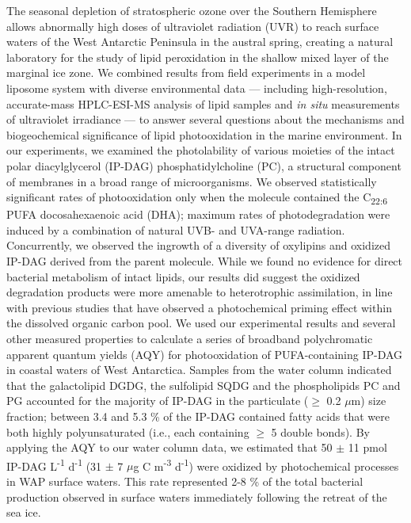 The seasonal depletion of stratospheric ozone over the Southern Hemisphere allows abnormally high doses of ultraviolet radiation (UVR) to reach surface waters of the West Antarctic Peninsula in the austral spring, creating a natural laboratory for the study of lipid peroxidation in the shallow mixed layer of the marginal ice zone. We combined results from field experiments in a model liposome system with diverse environmental data --- including high-resolution, accurate-mass HPLC-ESI-MS analysis of lipid samples and \emph{in situ} measurements of ultraviolet irradiance --- to answer several questions about the mechanisms and biogeochemical significance of lipid photooxidation in the marine environment. In our experiments, we examined the photolability of various moieties of the intact polar diacylglycerol (IP-DAG) phosphatidylcholine (PC), a structural component of membranes in a broad range of microorganisms. We observed statistically significant rates of photooxidation only when the molecule contained the C\textsubscript{22:6} PUFA docosahexaenoic acid (DHA); maximum rates of photodegradation were induced by a combination of natural UVB- and UVA-range radiation. Concurrently, we observed the ingrowth of a diversity of oxylipins and oxidized IP-DAG derived from the parent molecule. While we found no evidence for direct bacterial metabolism of intact lipids, our results did suggest the oxidized degradation products were more amenable to heterotrophic assimilation, in line with previous studies that have observed a photochemical priming effect within the dissolved organic carbon pool. We used our experimental results and several other measured properties to calculate a series of broadband polychromatic apparent quantum yields (AQY) for photooxidation of PUFA-containing IP-DAG in coastal waters of West Antarctica. Samples from the water column indicated that the galactolipid DGDG, the sulfolipid SQDG and the phospholipids PC and PG accounted for the majority of IP-DAG in the particulate ($\geq$ 0.2 $\mu$m) size fraction; between 3.4 and 5.3 \% of the IP-DAG contained fatty acids that were both highly polyunsaturated (i.e., each containing $\geq$ 5 double bonds). By applying the AQY to our water column data, we estimated that 50 $\pm$ 11 pmol IP-DAG L\textsuperscript{-1} d\textsuperscript{-1} (31 $\pm$ 7 $\mu$g C m\textsuperscript{-3} d\textsuperscript{-1}) were oxidized by photochemical processes in WAP surface waters. This rate represented 2-8 \% of the total bacterial production observed in surface waters immediately following the retreat of the sea ice.
\clearpage

